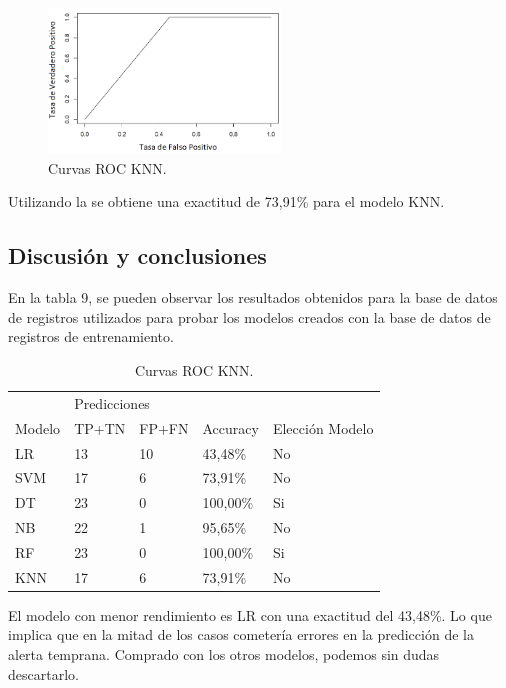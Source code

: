 \documentclass[spanish]{textolivre}
\begin{document}
\begin{figure}[htbp]
 \centering
 \includegraphics[width=0.55\textwidth]{figura13.png}
 \caption{Curvas ROC KNN.}
 \label{figura13}
\end{figure}

Utilizando la  se obtiene una exactitud de 73,91\% para el modelo KNN.

\subsection{Discusión y conclusiones}
En la tabla 9, se pueden observar los resultados obtenidos para la base de datos de registros utilizados para probar los modelos creados con la base de datos de registros de entrenamiento.

\begin{table}[htpb]
\centering
\caption{Curvas ROC KNN.}
\label{tab9}
\begin{tabular}{lllll}
\toprule 
 & \multicolumn{3}{l}{Predicciones}  & \\ 
\cmidrule{2-4}
Modelo     & TP+TN      & FP+FN     & Accuracy     & Elección Modelo
\\ 
\midrule
LR         & 13         & 10       & 43,48\%       & No
\\ 
SVM        & 17         & 6        & 73,91\%       & No
\\
DT         & 23         & 0        & 100,00\%      & Si
\\
NB         & 22         & 1        & 95,65\%       & No
\\
RF         & 23         & 0        & 100,00\%      & Si
\\
KNN        & 17         & 6        & 73,91\%       & No
\\
\bottomrule
\end{tabular}
\end{table}

El modelo con menor rendimiento es LR con una exactitud del 43,48\%. Lo que implica que en la mitad de los casos cometería errores en la predicción de la alerta temprana. Comprado con los otros modelos, podemos sin dudas descartarlo.
\end{document}
